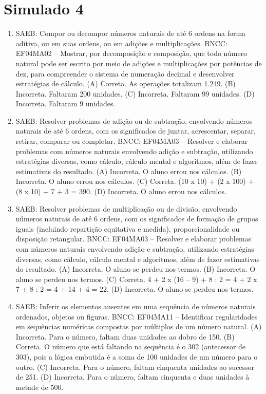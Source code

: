 \section*{Simulado 4}

\begin{enumerate}
\item
SAEB: Compor ou decompor números naturais de até 6 ordens na
forma aditiva, ou em suas ordens, ou em adições e multiplicações.
BNCC: EF04MA02 -- Mostrar, por decomposição e composição, que todo número natural pode ser escrito
por meio de adições e multiplicações por potências de dez, para compreender o sistema de
numeração decimal e desenvolver estratégias de cálculo.
(A) Correta. As operações totalizam 1.249.
(B) Incorreta. Faltaram 200 unidades.
(C) Incorreta. Faltaram 99 unidades.
(D) Incorreta. Faltaram 9 unidades.

\item
SAEB: Resolver problemas de adição ou de subtração,
envolvendo números naturais de até 6 ordens, com os significados de
juntar, acrescentar, separar, retirar, comparar ou completar.
BNCC: EF04MA03 -- Resolver e elaborar problemas com números naturais envolvendo adição e subtração,
utilizando estratégias diversas, como cálculo, cálculo mental e algoritmos, além de fazer estimativas
do resultado.
(A) Incorreta. O aluno errou nos cálculos.
(B) Incorreta. O aluno errou nos cálculos.
(C) Correta. (10 x 10) + (2 x 100) + (8 x 10) + 7 + 3 = 390.
(D) Incorreta. O aluno errou nos cálculos.

\item
SAEB: Resolver problemas de multiplicação ou de divisão, envolvendo números
naturais de até 6 ordens, com os significados de formação de grupos
iguais (incluindo repartição equitativa e medida), proporcionalidade ou
disposição retangular.
BNCC: EF04MA03 -- Resolver e elaborar problemas com números naturais envolvendo adição e subtração,
utilizando estratégias diversas, como cálculo, cálculo mental e algoritmos, além de fazer estimativas
do resultado.
(A) Incorreta. O aluno se perdeu nos termos.
(B) Incorreta. O aluno se perdeu nos termos.
(C) Correta. 4 + 2 x (16 -- 9) + 8 : 2 = 4 + 2 x 7 + 8 : 2 = 4 + 14 + 4 = 22.
(D) Incorreta. O aluno se perdeu nos termos.

\item
SAEB: Inferir os elementos ausentes em uma sequência de
números naturais ordenados, objetos ou figuras.
BNCC: EF04MA11 -- Identificar regularidades em sequências numéricas compostas por múltiplos de um
número natural.
(A) Incorreta. Para o número, faltam duas unidades ao dobro de 150.
(B) Correta. O número que está faltando na sequência é o 302 (antecessor de 303),
pois a lógica embutida é a soma de 100 unidades de um número para o
outro.
(C) Incorreta. Para o número, faltam cinquenta unidades ao sucessor de 251.
(D) Incorreta. Para o número, faltam cinquenta e duas unidades à metade de 500.


\end{enumerate}
